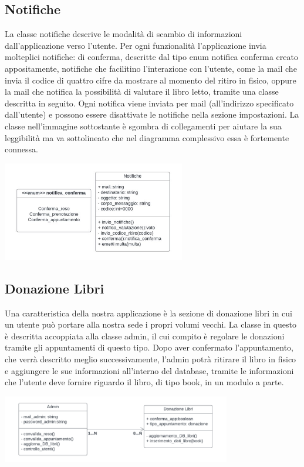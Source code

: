 \documentclass{article}
\begin{document}
\subsection{Notifiche} 
La classe notifiche descrive le modalità di scambio di informazioni dall’applicazione verso l’utente. Per ogni funzionalità l’applicazione invia molteplici notifiche:  di conferma, descritte dal tipo enum notifica conferma creato appositamente, notifiche che facilitino l’interazione con l’utente, come la mail che invia il codice di quattro cifre da mostrare al momento del ritiro in fisico, oppure la mail che notifica la possibilità di valutare il libro letto, tramite una classe descritta in seguito. Ogni notifica viene inviata per mail (all'indirizzo specificato dall’utente) e possono essere disattivate le notifiche nella sezione impostazioni.  La classe nell’immagine sottostante è sgombra di collegamenti per aiutare la sua leggibilità ma va sottolineato che nel diagramma complessivo essa è fortemente connessa.
\begin{center}
        \includegraphics[width=80mm]{D3/Images/Notifiche.jpg}
\end{center}

\subsection{Donazione Libri}
Una caratteristica della nostra applicazione è la sezione di donazione libri in cui un utente può portare alla nostra sede i propri volumi vecchi. La classe in questo è descritta accoppiata alla classe admin, il cui compito è regolare le donazioni tramite gli appuntamenti di questo tipo. Dopo aver confermato l’appuntamento, che verrà descritto meglio successivamente, l’admin potrà ritirare il libro in fisico e aggiungere le sue informazioni all’interno del database, tramite le informazioni che l’utente deve fornire riguardo il libro, di tipo book, in un modulo a parte.
\begin{center}
        \includegraphics[width=100mm]{D3/Images/Donazione.png}
\end{center}
\end{document}
